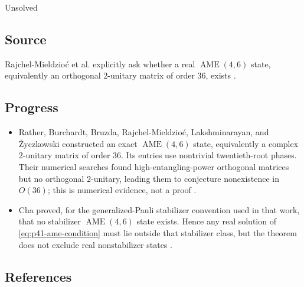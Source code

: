 Unsolved

\subsection*{Source}

Rajchel-Mieldzio\'c et al. explicitly ask whether a real
$\operatorname{AME}(4,6)$ state, equivalently an orthogonal $2$-unitary
matrix of order $36$, exists .

\subsection*{Progress}

\begin{itemize}
  \item Rather, Burchardt, Bruzda, Rajchel-Mieldzio\'c, Lakshminarayan, and
  \.{Z}yczkowski constructed an exact
  $\operatorname{AME}(4,6)$ state, equivalently a complex $2$-unitary matrix
  of order $36$.  Its entries use nontrivial twentieth-root phases.  Their
  numerical searches found high-entangling-power orthogonal matrices but no
  orthogonal $2$-unitary, leading them to conjecture nonexistence in $O(36)$;
  this is numerical evidence, not a proof
  .

  \item Cha proved, for the generalized-Pauli stabilizer convention used in
  that work, that no stabilizer $\operatorname{AME}(4,6)$ state exists.
  Hence any real solution of \eqref{eq:p41-ame-condition} must lie outside
  that stabilizer class, but the theorem does not exclude real
  nonstabilizer states .
\end{itemize}

\subsection*{References}

